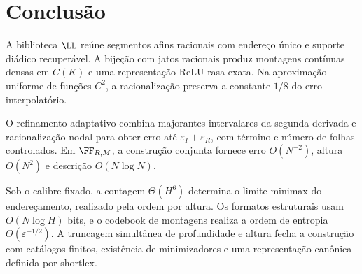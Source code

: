 \section{Conclusão}
A biblioteca $\LL$ reúne segmentos afins racionais com endereço único e suporte diádico recuperável. A bijeção com jatos racionais produz montagens contínuas densas em $C(K)$ e uma representação ReLU rasa exata. Na aproximação uniforme de funções $C^2$, a racionalização preserva a constante $1/8$ do erro interpolatório.

O refinamento adaptativo combina majorantes intervalares da segunda derivada e racio\-na\-li\-za\-ção nodal para obter erro até $\varepsilon_I+\varepsilon_R$, com término e número de folhas controlados. Em $\FF_{R,M}$, a construção conjunta fornece erro $O(N^{-2})$, altura $O(N^2)$ e descrição $O(N\log N)$.

Sob o calibre fixado, a contagem $\Theta(H^6)$ determina o limite minimax do endereçamento, realizado pela ordem por altura. Os formatos estruturais usam $O(N\log H)$ bits, e o codebook de montagens realiza a ordem de entropia $\Theta(\varepsilon^{-1/2})$. A truncagem simultânea de profundidade e altura fecha a construção com catálogos finitos, existência de minimizadores e uma representação canônica definida por shortlex.
